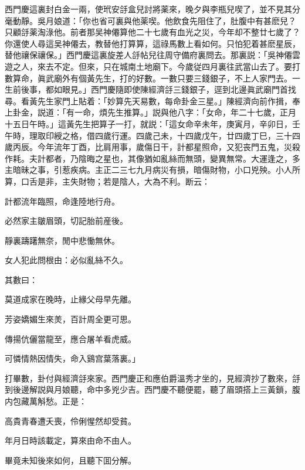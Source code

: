 西門慶這裏封白金一兩，使玳安㧱盒兒討將薬來，晚夕與李瓶兒喫了，並不見其分毫動靜。吳月娘道：「你也省可裏與他薬喫。他飲食先阻住了，肚腹中有甚麽兒？只顧㧱薬淘淥他。前者那吴神僊算他二十七歲有血光之災，今年却不整廿七歲了？你還使人尋這吴神僊去，教替他打算算，這祿馬數上看如何。只怕犯着甚麽星辰，替他禳保禳保。」西門慶這裏旋差人㧱帖兒往周守備府裏問去。那裏説：「吳神僊雲遊之人，來去不定。但來，只在城南土地廟下。今歲従四月裏往武當山去了。要打數算命，眞武廟外有個黃先生，打的好數。一數只要三錢銀子，不上人家門去。一生前後事，都如眼見。」西門慶隨即使陳經濟㧱三錢銀子，逕到北邊眞武廟門首找尋。看黃先生家門上貼着：「妙算先天易數，每命卦金三星。」陳經濟向前作揖，奉上卦金，説道：「有一命，煩先生推算。」説與他八字：「女命，年二十七歲，正月十五日午時。」這黃先生把算子一打，就説：「這女命辛未年，庚寅月，辛卯日，壬午時，理取印綬之格，借四歲行運。四歲己未，十四歲戊午，廿四歲丁巳，三十四歲丙辰。今年流年丁酉，比肩用事，歲傷日干，計都星照命，又犯丧門五鬼，災殺作耗。夫計都者，乃陰晦之星也，其像猶如亂絲而無頭，變異無常。大運逢之，多主暗昧之事，引惹疾病。主正二三七九月病災有損，暗傷財物，小口兇殃。小人所算，口舌是非，主失財物；若是陰人，大為不利。断云：

\begin{myquote}
計都流年臨照，命逢陸地行舟。

必然家主皺眉頭，切記胎前産後。

靜裏躊躇無奈，閒中悲慟無休。

女人犯此問根由：必似亂絲不久。　
\end{myquote}

其數曰：

\begin{myquote}
莫道成家在晚時，止緣父母早先離。

芳姿嬌媚生來羙，百計周全更可思。

傳揚伉儷當龍至，應合屠羊看虎威。

可憐情熱因情失，命入鷄宫葉落裏。」
\end{myquote}

打畢數，卦付與經濟㧱來家。西門慶正和應伯爵溫秀才坐的，見經濟抄了數來，㧱到後邊解説與月娘聽，命中多兇少吉。西門慶不聽便罷，聽了眉頭搭上三黃鎖，腹内包藏萬斛愁。正是：

\begin{myquote}
高貴青春遭夭喪，伶俐惺然却受貧。

年月日時該載定，算來由命不由人。
\end{myquote}

畢竟未知後來如何，且聽下囬分解。


